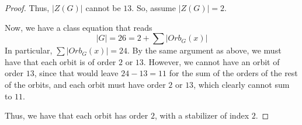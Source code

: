 \documentclass[12pt,reqno]{amsart}
\begin{document}
\begin{proof}
    Thus, $|Z(G)|$ cannot be $13$. So, assume $|Z(G)| = 2$.

    Now, we have a class equation that reads
    \[
    |G| = 26 = 2 + \sum|Orb_G(x)|
    \]
    In particular, $\sum|Orb_G(x)| = 24$. By the same argument as above, we
    must have that each orbit is of order $2$ or $13$. However, we cannot
    have an orbit of order $13$, since that would leave $24-13=11$ for the sum
    of the orders of the rest of the orbits, and each orbit must have order $2$
    or $13$, which clearly cannot sum to $11$.

    Thus, we have that each orbit has order $2$, with a stabilizer of index
    $2$. 
\end{proof}
\end{document}
